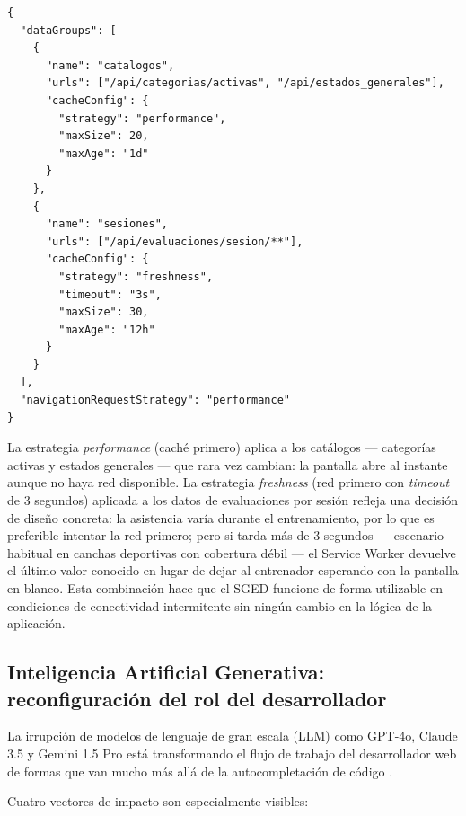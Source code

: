 \documentclass[12pt,a4paper]{article}
\begin{document}
\begin{lstlisting}[style=json, caption={Estrategias de caché del Service Worker (\texttt{frontend/ngsw-config.json})}]
{
  "dataGroups": [
    {
      "name": "catalogos",
      "urls": ["/api/categorias/activas", "/api/estados_generales"],
      "cacheConfig": {
        "strategy": "performance",
        "maxSize": 20,
        "maxAge": "1d"
      }
    },
    {
      "name": "sesiones",
      "urls": ["/api/evaluaciones/sesion/**"],
      "cacheConfig": {
        "strategy": "freshness",
        "timeout": "3s",
        "maxSize": 30,
        "maxAge": "12h"
      }
    }
  ],
  "navigationRequestStrategy": "performance"
}
\end{lstlisting}

La estrategia \textit{performance} (caché primero) aplica a los catálogos
--- categorías activas y estados generales --- que rara vez cambian: la pantalla
abre al instante aunque no haya red disponible.
La estrategia \textit{freshness} (red primero con \textit{timeout} de 3 segundos)
aplicada a los datos de evaluaciones por sesión refleja una decisión de diseño
concreta: la asistencia varía durante el entrenamiento, por lo que es preferible
intentar la red primero; pero si tarda más de 3 segundos --- escenario habitual en
canchas deportivas con cobertura débil --- el Service Worker devuelve el último
valor conocido en lugar de dejar al entrenador esperando con la pantalla en blanco.
Esta combinación hace que el SGED funcione de forma utilizable en condiciones de
conectividad intermitente sin ningún cambio en la lógica de la aplicación.

\subsection{Inteligencia Artificial Generativa: reconfiguración del rol del desarrollador}

La irrupción de modelos de lenguaje de gran escala (LLM) como GPT-4o, Claude 3.5 y
Gemini 1.5 Pro está transformando el flujo de trabajo del desarrollador web de formas que
van mucho más allá de la autocompletación de código \parencite{github2023}.

Cuatro vectores de impacto son especialmente visibles:
\end{document}
